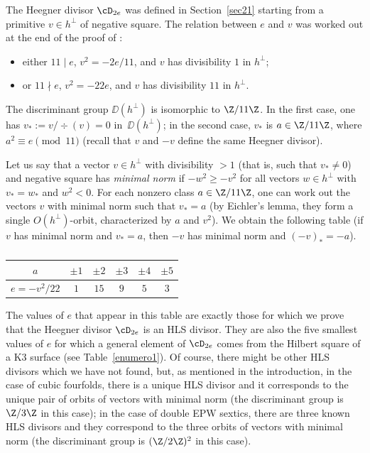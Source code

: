The Heegner divisor $\cD_{2e}$ was defined in Section~\ref{sec21} starting from a primitive $v\in h^\bot$ of negative square. The relation between $e$ and $v$ was worked out at the end of the proof of \cite[Prop.\,4.1]{dm}:
\begin{itemize}
\item either $11\mid e$, $v^2=-2e/11$, and $v$ has divisibility $1$ in $ h^\bot$;
\item or $11\nmid e$, $v^2=-22e $, and $v$ has divisibility $11$ in $ h^\bot$.
\end{itemize}
The discriminant group $\DD(h^\bot) $ is isomorphic to $\Z/11\Z$. In the first case, one has $v_*:=v/\div(v)=0$ in~$\DD(h^\bot)$; in the second case, $v_*$ is $a \in \Z/11\Z$, where $a^2\equiv e\pmod{11}$ (recall that $v$ and $-v$ define the same Heegner divisor).

Let us say that a vector $v\in h^\bot$ with divisibility $>1$ (that is, such that $v_*\ne0$) and negative square has \emph{minimal norm} if $-w^2\ge -v^2$ for all vectors $w\in h^\bot$ with $v_*=w_*$ and $w^2<0$. For each nonzero class $a \in \Z/11\Z$, one can work out the vectors $v$ with minimal norm such that $v_*=a$ (by Eichler's lemma, they form a single $O(h^\bot)$-orbit, characterized by $a$ and $v^2$). We obtain the following table (if $v$ has minimal norm and $v_*=a$, then $-v$ has minimal norm and $(-v)_*=-a$).

\begin{table}[htb!]
\renewcommand\arraystretch{1.5}
\begin{tabular}{|c|c|c|c|c|c|}
\hline
$a$&$\pm 1$&$\pm2$&$\pm3$&$\pm4$&$\pm5$
\\
\hline
$e=-v^2/22$&$1$&$15$&$9$&$5$&$3$
\\
\hline
\end{tabular}
\vspace{\baselineskip}
\caption{}\label{enumero2}
\vspace{-\baselineskip}
\end{table}
The values of $e$ that appear in this table are exactly those for which we prove that the Heegner divisor $\cD_{2e}$ is an HLS divisor. They are also the five smallest values of $e$ for which a general element of $\cD_{2e}$ comes from the Hilbert square of a K3 surface (see Table~\ref{enumero1}). Of course, there might be other HLS divisors which we have not found, but, as mentioned in the introduction, in the case of cubic fourfolds, there is a unique HLS divisor and it corresponds to the unique pair of orbits of vectors with minimal norm (the discriminant group is $\Z/3\Z$ in this case); in the case of double EPW sextics, there are three known HLS divisors and they correspond to the three orbits of vectors with minimal norm (the discriminant group is $(\Z/2\Z)^2$ in this case).

